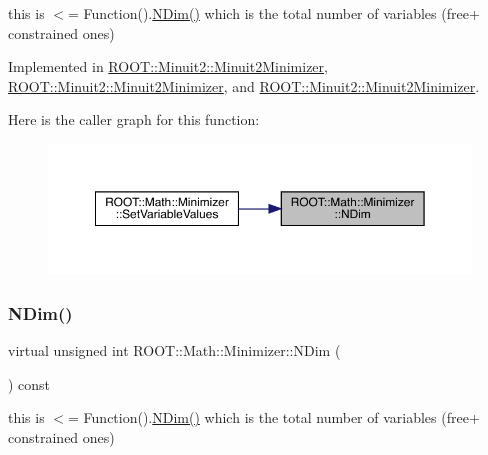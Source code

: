 this is $<$= Function().\mbox{\hyperlink{classROOT_1_1Math_1_1Minimizer_aecb9b9ee5c6a9fd7db3196ae3ac5e335}{N\+Dim()}} which is the total number of variables (free+ constrained ones) 

Implemented in \mbox{\hyperlink{classROOT_1_1Minuit2_1_1Minuit2Minimizer_a6ed2c7d99296e222f0f43295e302eb9e}{R\+O\+O\+T\+::\+Minuit2\+::\+Minuit2\+Minimizer}}, \mbox{\hyperlink{classROOT_1_1Minuit2_1_1Minuit2Minimizer_a6ed2c7d99296e222f0f43295e302eb9e}{R\+O\+O\+T\+::\+Minuit2\+::\+Minuit2\+Minimizer}}, and \mbox{\hyperlink{classROOT_1_1Minuit2_1_1Minuit2Minimizer_a6ed2c7d99296e222f0f43295e302eb9e}{R\+O\+O\+T\+::\+Minuit2\+::\+Minuit2\+Minimizer}}.

Here is the caller graph for this function\+:
\nopagebreak
\begin{figure}[H]
\begin{center}
\leavevmode
\includegraphics[width=350pt]{dc/dc4/classROOT_1_1Math_1_1Minimizer_aecb9b9ee5c6a9fd7db3196ae3ac5e335_icgraph}
\end{center}
\end{figure}
\mbox{\label{classROOT_1_1Math_1_1Minimizer_aecb9b9ee5c6a9fd7db3196ae3ac5e335}} 
\subsubsection{\texorpdfstring{NDim()}{NDim()}\hspace{0.1cm}{\footnotesize\ttfamily [3/3]}}
{\footnotesize\ttfamily virtual unsigned int R\+O\+O\+T\+::\+Math\+::\+Minimizer\+::\+N\+Dim (\begin{DoxyParamCaption}{ }\end{DoxyParamCaption}) const\hspace{0.3cm}{\ttfamily [pure virtual]}}

this is $<$= Function().\mbox{\hyperlink{classROOT_1_1Math_1_1Minimizer_aecb9b9ee5c6a9fd7db3196ae3ac5e335}{N\+Dim()}} which is the total number of variables (free+ constrained ones) 


